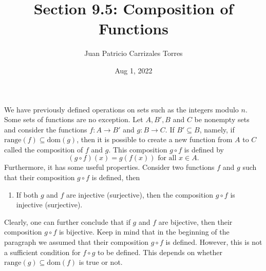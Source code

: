 \documentclass[12pt]{article}
\newcommand{\Dom}[1]{\mathrm{dom}(#1)}
\newcommand{\Range}[1]{\mathrm{range}(#1)}
\begin{document}
  
 \title{Section 9.5: Composition of Functions}
   \author{Juan Patricio Carrizales Torres}
     \date{Aug 1, 2022}
       \maketitle
   
       We have previously defined operations on sets such as the integers modulo $n$. Some sets of functions are no exception. Let $A,B',B$ and $C$ be nonempty sets and consider the functions $f:A\to B'$ and $g:B\to C$. If $B' \subseteq B$, namely, if $\Range{f} \subseteq \Dom{g}$, then it is possible to create a new function from $A$ to $C$ called the composition of $f$ and $g$. This composition $g\circ f$ is defined by
    \begin{equation*}
   ( g\circ f)(x) = g(f(x)) \text{ for all } x\in A.
    \end{equation*}
    Furthermore, it has some useful properties. Consider two functions $f$ and $g$ such that their composition $g\circ f$ is defined, then 
    \begin{enumerate}
      \item If both $g$ and $f$ are injective (surjective), then the composition $g\circ f$ is injective (surjective).
    \end{enumerate}
    Clearly, one can further conclude that if $g$ and $f$ are bijective, then their composition $g\circ f$ is bijective. Keep in mind that in the beginning of the paragraph we assumed that their composition $g\circ f$ is defined. However, this is not a sufficient condition for $f\circ g$ to be defined. This depends on whether $\Range{g} \subseteq \Dom{f}$ is true or not. \\
\end{document}
